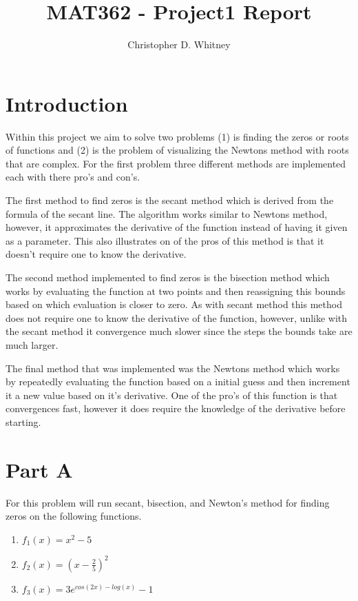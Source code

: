 \documentclass{article}
\begin{document}
\title{MAT362 - Project1 Report}
\author{Christopher D. Whitney}

\maketitle

\section*{Introduction}
Within this project we aim to solve two problems (1) is finding the zeros or roots of functions and (2) is the problem of visualizing the Newtons method with roots that are complex. For the first problem three different methods are implemented each with there pro's and con's. 

The first method to find zeros is the secant method which is derived from the formula of the secant line. The algorithm works similar to Newtons method, however, it approximates the derivative of the function instead of having it given as a parameter. This also illustrates on of the pros of this method is that it doesn't require one to know the derivative. 

The second method implemented to find zeros is the bisection method which works by evaluating the function at two points and then reassigning this bounds based on which evaluation is closer to zero. As with secant method this method does not require one to know the derivative of the function, however, unlike with the secant method it convergence much slower since the steps the bounds take are much larger. 

The final method that was implemented was the Newtons method which works by repeatedly evaluating the function based on a initial guess and then increment it a new value based on it's derivative. One of the pro's of this function is that convergences fast, however it does require the knowledge of the derivative before starting. 

\section*{Part A}

For this problem will run secant, bisection, and Newton's method for finding zeros on the following functions. 
\begin{enumerate}
	\item $ f_1 (x) = x^2 - 5$
	\item $ f_2 (x) = (x - \frac{2}{5	} ) ^ 2 $
	\item $ f_3 (x) = 3e^{cos(2x) - log(x)} - 1 $
\end{enumerate}
\end{document}
